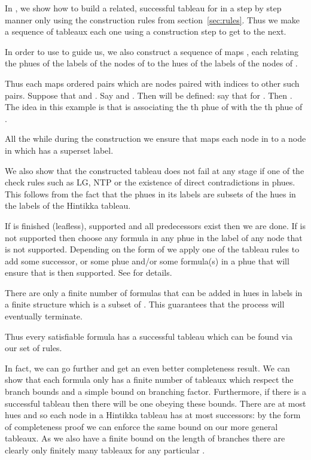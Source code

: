 \documentclass[submission,copyright,creativecommons]{eptcs}
\begin{document}
In \cite{Rey:fasttablong}, we show how to build a related, successful tableau
for 
in a step by step manner
only using the 
construction rules from section~\ref{sec:rules}.
Thus we make a sequence
 of tableaux 
each one using a construction step to get to the next.

In order to use  to guide us,
we also construct
a sequence of maps
,
each  relating the 
phues of the labels of the nodes of  to the hues of the 
labels of the nodes
of .

Thus each  maps ordered pairs which are
nodes paired with indices
to other such pairs.
Suppose that 
and .
Say  and 
.
Then  will be defined: say that
 for .
Then .
The idea in this example is that  is associating the th phue
of  with the th phue of .

All the while during the
construction
we ensure that 
  maps 
each node in  to a node in 
which has a superset label.

We also show that the constructed tableau 
does not fail at any stage if one of the check rules
such as LG, NTP or the
existence of direct contradictions in phues.
This follows from the fact that the
phues in its labels are subsets 
of the hues in the
labels of the Hintikka tableau.

If  is finished (leafless), supported and 
all predecessors exist then we are done.
If  is not supported then choose any
formula  in any phue in the label
of any node that is not supported.
Depending on the form of 
we apply one of the tableau rules
to add some successor,
or some phue
and/or some formula(s)
in a phue that will ensure that
 is then supported.
See \cite{Rey:fasttablong} for details.

There are only a finite number of 
formulas that can be added in hues in labels in a finite structure which is a subset of 
.
This guarantees
that the process will eventually terminate.

Thus every satisfiable formula
has a successful tableau
which can be found via our set
of rules.

In fact, we can go further and get an
even better completeness result.
We can show that each formula
 only has a
finite number of tableaux
which respect the branch bounds
and a simple bound on branching factor.
Furthermore, if there is a successful
tableau then there will be one
obeying these bounds.
There are at most  hues
and so each node
in a Hintikka tableau has at most
 successors:
by the form of completeness proof we can
enforce the same bound on our
more general tableaux.
As we also have a finite bound on the length
of branches
there are clearly only finitely many
tableaux for any particular
.
\end{document}
